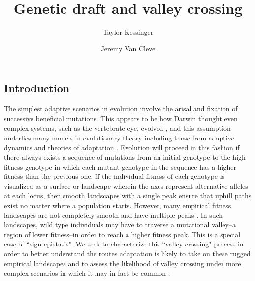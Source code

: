 \documentclass[rmp]{revtex4}
\title{Genetic draft and valley crossing}
\author[$\ast$]{Taylor Kessinger}
\author[$\ast$,1]{Jeremy Van Cleve}
\affil[$\ast$]{Department of Biology, University of Kentucky}
\begin{document}
\maketitle
\thispagestyle{firststyle}
\marginmark
\firstpagefootnote



\begin{spacing}{1.5}

\section{Introduction}

The simplest adaptive scenarios in evolution involve the arisal and fixation of successive beneficial mutations.
This appears to be how Darwin thought even complex systems, such as the vertebrate eye, evolved \citep{darwin_1859}, and this assumption underlies many models in evolutionary theory including those from adaptive dynamics \citep{Geritz:Kisdi:1998,Dercole:Rinaldi:2008} and theories of adaptation \citep{Gillespie:1983,Orr:1998,Gillespie:1991}.
Evolution will proceed in this fashion if there always exists a sequence of mutations from an initial genotype to the high fitness genotype in which each mutant genotype in the sequence has a higher fitness than the previous one.
If the individual fitness of each genotype is visualized as a surface or landscape wherein the axes represent alternative alleles at each locus, then smooth landscapes with a single peak ensure that uphill paths exist no matter where a population starts.
However, many empirical fitness landscapes are not completely smooth and have multiple peaks \citep[reviewed in][]{Szendro:Schenk:2013,Visser:Krug:2014,Obolski:Ram:2018}.
In such landscapes, wild type individuals may have to traverse a mutational valley--a region of lower fitness--in order to reach a higher fitness peak.
This is a special case of ``sign epistasis".
We seek to characterize this ``valley crossing" process in order to better understand the routes adaptation is likely to take on these rugged empirical landscapes \citep[e.g.,][]{Aguilar-Rodriguez:Payne:2017} and to assess the likelihood of valley crossing under more complex scenarios in which it may in fact be common \citep[e.g.][]{trotter_2014}.


\end{spacing}
\end{document}
